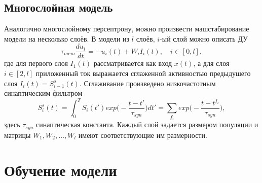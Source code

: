 \subsection{Многослойная модель}
\indent Аналогично многослойному персептрону, можно произвести машстабирование модели на несколько слоёв. В модели из $l$ слоёв, $i$-ый слой можно описать ДУ
\begin{equation}
\tau_{mem} \frac{du_{i}}{dt} = -u_{i}(t) + W_{i} I_{i}(t),\quad i \in [0, l],
\end{equation}
где для первого слоя $I_{1}(t)$ рассматривается как вход $x(t)$, а для слоя $i \in [2, l]$ приложенный ток выражается сглаженной активностью предыдушего слоя $I_{i}(t) = S_{i-1}^{s}(t)$. Сглаживание произведено низкочастотным синаптическим фильтром
\begin{equation} \label{eq:p2_2_syn}
S_{i}^{s}(t) = \int_{0}^{T} S_{i}(t') exp\Big(-\frac{t-t'}{\tau_{syn}}\Big)dt' = \sum_{f_{i}} exp\Big(-\frac{t-t^{f_{i}}}{\tau_{syn}}\Big),
\end{equation}
здесь $\tau_{syn}$ синаптическая константа. Каждый слой задается размером популяции и матрицы $W_{1}, W_{2}, \dots, W_{l}$ имеют соответствующие им размерности.

\section{Обучение модели} \label{sect2_3}
